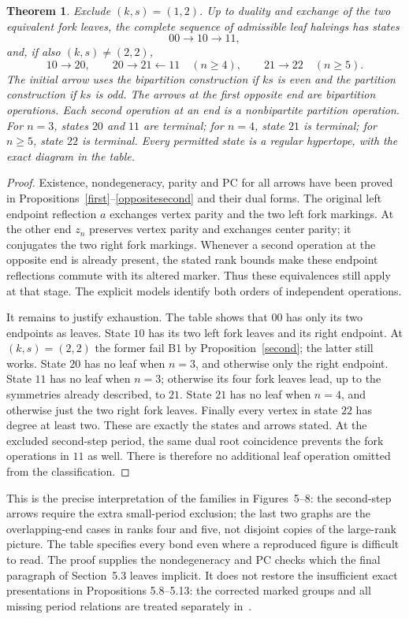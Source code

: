 \documentclass[11pt,a4paper]{article}
\newtheorem{theorem}{Theorem}
\begin{document}
\begin{theorem}\label{complete}
Exclude $(k,s)=(1,2)$. Up to duality and exchange of the two
equivalent fork leaves, the complete sequence of admissible leaf
halvings has states
\[
 00\longrightarrow10\longrightarrow11,
\]
and, if also $(k,s)\ne(2,2)$,
\[
 10\longrightarrow20,\qquad
 20\longrightarrow21\longleftarrow11\quad(n\ge4),\qquad
 21\longrightarrow22\quad(n\ge5).
\]
The initial arrow uses the bipartition construction if $ks$ is even
and the partition construction if $ks$ is odd. The arrows at the
first opposite end are bipartition operations. Each second operation
at an end is a nonbipartite partition operation.
For $n=3$, states $20$ and $11$ are terminal; for $n=4$, state
$21$ is terminal; for $n\ge5$, state $22$ is terminal.
Every permitted state is a regular hypertope, with the exact diagram
in the table.
\end{theorem}
\begin{proof}
Existence, nondegeneracy, parity and PC for all arrows have been
proved in Propositions~\ref{first}--\ref{oppositesecond} and their
dual forms. The original left endpoint reflection $a$ exchanges
vertex parity and the two left fork markings. At the other end
$z_n$ preserves vertex parity and exchanges center parity; it
conjugates the two right fork markings. Whenever a second operation
at the opposite end is already present, the stated rank bounds
make these endpoint reflections commute with its altered marker.
Thus these equivalences still apply at that stage.
The explicit models identify both orders of independent operations.

It remains to justify exhaustion. The table shows that $00$ has
only its two endpoints as leaves. State $10$ has its two left
fork leaves and its right endpoint. At $(k,s)=(2,2)$ the former
fail B1 by Proposition~\ref{second}; the latter still works.
State $20$ has no leaf when $n=3$, and otherwise only the right
endpoint. State $11$ has no leaf when $n=3$; otherwise its four
fork leaves lead, up to the symmetries already described, to $21$.
State $21$ has no leaf when $n=4$, and otherwise just the two
right fork leaves. Finally every vertex in state $22$ has degree
at least two. These are exactly the states and arrows stated.
At the excluded second-step period, the same dual root coincidence
prevents the fork operations in $11$ as well. There is therefore
no additional leaf operation omitted from the classification.
\end{proof}

This is the precise interpretation of the families in Figures~5--8:
the second-step arrows require the extra small-period exclusion;
the last two graphs are the overlapping-end cases in ranks four
and five, not disjoint copies of the large-rank picture. The table
specifies every bond even where a reproduced figure is difficult
to read. The proof supplies the nondegeneracy and PC checks which
the final paragraph of Section~5.3 leaves implicit. It does not
restore the insufficient exact presentations in Propositions
5.8--5.13: the corrected marked groups and all missing period
relations are treated separately in~\cite{Affine}.
\end{document}
